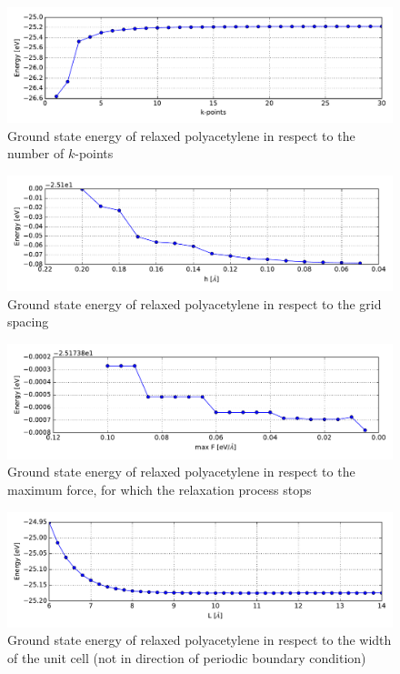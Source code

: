 \begin{figure}[]
	\centering
	\includegraphics[width = 13cm]{Images/polyacetylene/convergence/kpts-energy}
	\caption{Ground state energy of relaxed polyacetylene in respect to the number of $k$-points}
	\label{image_poly_kpts_energy}
\end{figure}
\begin{figure}[]
	\centering
	\includegraphics[width = 13cm]{Images/polyacetylene/convergence/gridspacing-energy}
	\caption{Ground state energy of relaxed polyacetylene in respect to the grid spacing}
	\label{image_poly_grid_energy}
\end{figure}
\begin{figure}[]
	\centering
	\includegraphics[width = 13cm]{Images/polyacetylene/convergence/forces-energy}
	\caption{Ground state energy of relaxed polyacetylene in respect to the maximum force, for which the relaxation process stops}
	\label{image_poly_force_energy}
\end{figure}
\begin{figure}[]
	\centering
	\includegraphics[width = 13cm]{Images/polyacetylene/convergence/unit_cell_width}
	\caption{Ground state energy of relaxed polyacetylene in respect to the width of the unit cell (not in direction of periodic boundary condition)}
	\label{image_poly_width_energy}
\end{figure}
\newpage



